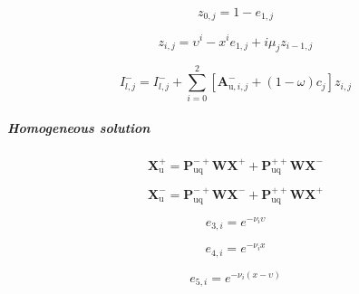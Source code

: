\begin{equation}
z_{0,j} = 1 - e_{1,j}
\label{eq:source_function_integration-local_source_classical-upward-forward-thermal_source-series}
\end{equation}

\begin{equation}
z_{i,j} = \upsilon^{i} - x^{i} e_{1,j} + i \mu_{j} z_{i-1,j}
\label{eq:source_function_integration-local_source_classical-upward-forward-thermal_source-series}
\end{equation}

\begin{equation}
I^{-}_{l,j} = I^{-}_{l,j} + \sum^{2}_{i = 0} \left[\mathbf{A}^{-}_{\mathrm{u},i,j} + (1 - \omega) c_{j}\right] z_{i,j}
\label{eq:source_function_integration-local_source_classical-upward-forward-thermal_source-I_p_l_i_1}
\end{equation}


\subparagraph{Homogeneous solution}
\label{sec:source_function_integration-local_source_classical-downward-forward-homogeneous_solution}

\begin{equation}
\mathbf{X}^{+}_{\mathrm{u}} = \mathbf{P}^{-+}_{\mathrm{uq}}\mathbf{W}\mathbf{X}^{+} + \mathbf{P}^{++}_{\mathrm{uq}}\mathbf{W}\mathbf{X}^{-}
\label{eq:source_function_integration-local_source_classical-upward-forward-solar_source-X_p_u}
\end{equation}

\begin{equation}
\mathbf{X}^{-}_{\mathrm{u}} = \mathbf{P}^{-+}_{\mathrm{uq}}\mathbf{W}\mathbf{X}^{-} + \mathbf{P}^{++}_{\mathrm{uq}}\mathbf{W}\mathbf{X}^{+}
\label{eq:source_function_integration-local_source_classical-upward-forward-homogeneous_solution-X_m_u}
\end{equation}

\begin{equation}
e_{3,i} = e^{-\nu_{i}\upsilon}
\label{eq:source_function_integration-local_source_classical-upward-forward-homogeneous_solution-e_3_i}
\end{equation}

\begin{equation}
e_{4,i} = e^{-\nu_{i}x}
\label{eq:source_function_integration-local_source_classical-upward-forward-homogeneous_solution-e_4_i}
\end{equation}

\begin{equation}
e_{5,i} = e^{-\nu_{i}(x - \upsilon)}
\label{eq:source_function_integration-local_source_classical-upward-forward-homogeneous_solution-e_5_i}
\end{equation}

